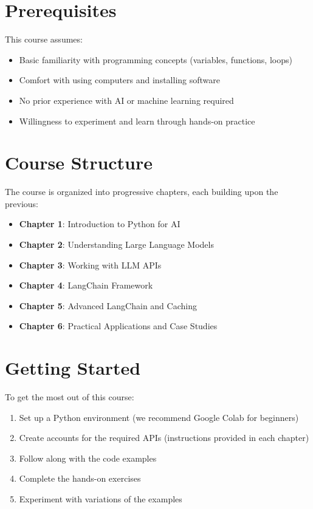 \documentclass[
]{book}
\providecommand{\tightlist}{%
  \setlength{\itemsep}{0pt}\setlength{\parskip}{0pt}}
\begin{document}
\section{Prerequisites}\label{prerequisites}

This course assumes:

\begin{itemize}
\tightlist
\item
  Basic familiarity with programming concepts (variables, functions, loops)
\item
  Comfort with using computers and installing software
\item
  No prior experience with AI or machine learning required
\item
  Willingness to experiment and learn through hands-on practice
\end{itemize}

\section{Course Structure}\label{course-structure}

The course is organized into progressive chapters, each building upon the previous:

\begin{itemize}
\tightlist
\item
  \textbf{Chapter 1}: Introduction to Python for AI
\item
  \textbf{Chapter 2}: Understanding Large Language Models
\item
  \textbf{Chapter 3}: Working with LLM APIs
\item
  \textbf{Chapter 4}: LangChain Framework
\item
  \textbf{Chapter 5}: Advanced LangChain and Caching
\item
  \textbf{Chapter 6}: Practical Applications and Case Studies
\end{itemize}

\section{Getting Started}\label{getting-started}

To get the most out of this course:

\begin{enumerate}
\def\labelenumi{\arabic{enumi}.}
\tightlist
\item
  Set up a Python environment (we recommend Google Colab for beginners)
\item
  Create accounts for the required APIs (instructions provided in each chapter)
\item
  Follow along with the code examples
\item
  Complete the hands-on exercises
\item
  Experiment with variations of the examples
\end{enumerate}
\end{document}
